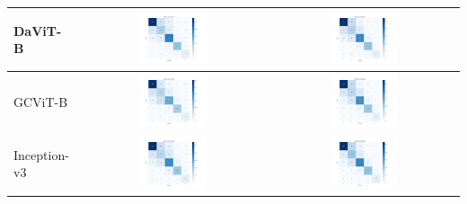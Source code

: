 \begin{table}[!htbp]
\begin{tabular}{|l|c|c|}
        DaViT-B & \includegraphics[width=0.37\textwidth]{figs/confusion_matrices/davit_base-msft_in1k_cm_cross_entropy.png} & \includegraphics[width=0.37\textwidth]{figs/confusion_matrices/davit_base-msft_in1k_cm_corn.png} \\ \hline
        GCViT-B & \includegraphics[width=0.37\textwidth]{figs/confusion_matrices/gcvit_base-in1k_cm_cross_entropy.png} & \includegraphics[width=0.37\textwidth]{figs/confusion_matrices/gcvit_base-in1k_cm_corn.png} \\ \hline
        Inception-v3 & \includegraphics[width=0.37\textwidth]{figs/confusion_matrices/inception_v3_cm_cross_entropy.png} & \includegraphics[width=0.37\textwidth]{figs/confusion_matrices/inception_v3_cm_corn.png} \\ \hline

\end{tabular}
\end{table}
